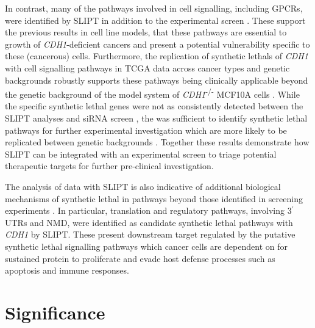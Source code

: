 In contrast, many of the pathways involved in cell signalling, including \glspl{GPCR}, were identified by \gls{SLIPT} in addition to the experimental screen \citep{Telford2015}. These support the previous results in cell line models, that these pathways are \gls{essential} to growth of \textit{CDH1}-deficient cancers and present a potential vulnerability specific to these (cancerous) cells. Furthermore, the replication of \glspl{synthetic lethal} of \textit{CDH1} with cell signalling pathways in \gls{TCGA} data across cancer types and genetic backgrounds robustly supports these pathways being clinically applicable beyond the genetic background of the model system of \textit{CDH1}\textsuperscript{-/-} \gls{MCF10A} cells \citep{Chen2014}. While the specific \gls{synthetic lethal} genes were not as consistently detected between the \gls{SLIPT} analyses and \gls{siRNA} screen \citep{Telford2015}, the was sufficient to identify \gls{synthetic lethal} pathways for further experimental investigation which are more likely to be replicated between genetic backgrounds \citep{Dixon2008}. Together these results demonstrate how \gls{SLIPT} can be integrated with an experimental screen to triage potential therapeutic targets  for further pre-clinical investigation.

The analysis of  data with \gls{SLIPT} is also indicative of additional biological mechanisms of \gls{synthetic lethal} in pathways beyond those identified in screening experiments \citep{Telford2015}. In particular, translation and regulatory pathways, involving 3$^\prime$ \glspl{UTR} and \gls{NMD}, were identified as candidate \gls{synthetic lethal} pathways with \textit{CDH1} by \gls{SLIPT}. These present downstream target regulated by the putative \gls{synthetic lethal} signalling pathways which cancer cells are dependent on for sustained protein  \citep{Gao2015} to proliferate and evade host defense processes such as apoptosis and immune responses. 



\section{Significance}
\label{chapt6:significance}

